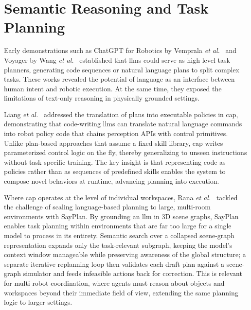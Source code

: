 \section{Semantic Reasoning and Task Planning}
Early demonstrations such as ChatGPT for Robotics by Vemprala \emph{et al.}~\cite{vemprala2023chatgptroboticsdesignprinciples} and Voyager by Wang \emph{et al.}~\cite{wang2023voyageropenendedembodiedagent} established that \glspl{llm} could serve as high-level task planners, generating code sequences or natural language plans to split complex tasks. These works revealed the potential of language as an interface between human intent and robotic execution. At the same time, they exposed the limitations of text-only reasoning in physically grounded settings.

Liang \emph{et al.}~\cite{liang2023codepolicieslanguagemodel} addressed the translation of plans into executable policies in \gls{cap}, demonstrating that code-writing \glspl{llm} can translate natural language commands into robot policy code that chains perception APIs with control primitives. Unlike plan-based approaches that assume a fixed skill library, \gls{cap} writes parameterized control logic on the fly, thereby generalizing to unseen instructions without task-specific training. The key insight is that representing code as policies rather than as sequences of predefined skills enables the system to compose novel behaviors at runtime, advancing planning into execution.

Where \gls{cap} operates at the level of individual workspaces, Rana \emph{et al.}~\cite{rana2023sayplangroundinglargelanguage} tackled the challenge of scaling language-based planning to large, multi-room environments with SayPlan. By grounding an \gls{llm} in 3D scene graphs, SayPlan enables task planning within environments that are far too large for a single model to process in its entirety. Semantic search over a collapsed scene-graph representation expands only the task-relevant subgraph, keeping the model’s context window manageable while preserving awareness of the global structure; a separate iterative replanning loop then validates each draft plan against a scene-graph simulator and feeds infeasible actions back for correction. This is relevant for multi-robot coordination, where agents must reason about objects and workspaces beyond their immediate field of view, extending the same planning logic to larger settings.

